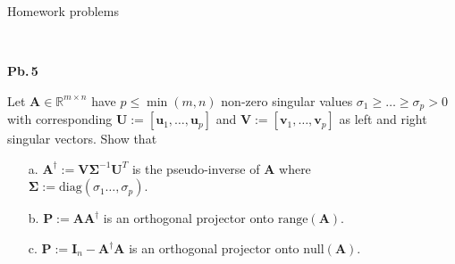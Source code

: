 \documentclass[t,usepdftitle=false]{beamer}
\begin{document}
\begin{frame}{Homework problems}
\begin{minipage}[t]{0.89\textwidth}
\end{minipage}\vspace{.08cm}\\
\begin{minipage}[t]{0.1\textwidth}
\textbf{Pb.$\,$5}
\end{minipage}
\begin{minipage}[t]{0.89\textwidth}
Let $\mathbf{A}\in\mathbb{R}^{m\times n}$ have $p\leq\min(m,n)$ non-zero singular values $\sigma_1\geq\dots\geq\sigma_p>0$ with corresponding $\mathbf{U}:=[\mathbf{u}_1,\dots,\mathbf{u}_p]$ and $\mathbf{V}:=[\mathbf{v}_1,\dots,\mathbf{v}_p]$ as left and right singular vectors.
Show that
\begin{itemize}
\item[a.]$\!\mathbf{A}^\dagger\!:=\mathbf{V}\boldsymbol{\Sigma}^{-1}\mathbf{U}^T\!$ is the pseudo-inverse of $\mathbf{A}$ where\\
$\boldsymbol{\Sigma}:=\mathrm{diag}(\sigma_1\dots,\sigma_p)$.\vspace{-.08cm}
\item[b.]$\mathbf{P}:=\mathbf{A}\mathbf{A}^\dagger$ is an orthogonal projector onto $\mathrm{range}(\mathbf{A})$.\vspace{-.08cm}
\item[c.]$\mathbf{P}:=\mathbf{I}_n-\mathbf{A}^\dagger\mathbf{A}$ is an orthogonal projector onto $\mathrm{null}(\mathbf{A})$.
\end{itemize}
\end{minipage}
\end{frame}
\end{document}
